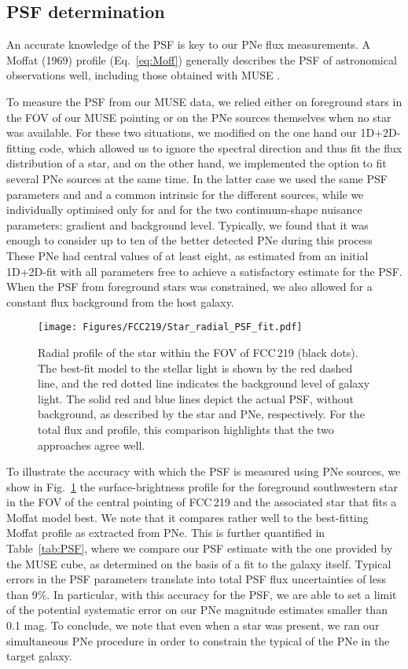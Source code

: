 \documentclass{aa}
\newcommand{\placefigseven}{
\begin{figure}
    \texttt{[image: Figures/FCC219/Star\_radial\_PSF\_fit.pdf]}
    \caption{Radial profile of the star within the FOV of FCC\,219 (black dots). The best-fit model to the stellar light is shown by the red dashed line, and the red dotted line indicates the background level of galaxy light. The solid red and blue lines depict the actual PSF, without background, as described by the star and PNe, respectively. For the total flux and profile, this comparison highlights that the two approaches agree well.}
    \label{fig:PSF_star_vs_PNe}
\end{figure}
}
\begin{document}
\subsection{PSF determination}

An accurate knowledge of the PSF is key to our PNe flux measurements. A Moffat (1969) profile (Eq.~\ref{eq:Moff}) generally describes the PSF of astronomical observations well, including those obtained with MUSE \citep{bacon_muse_2010}.

To measure the PSF from our MUSE data, we relied either on foreground stars in the FOV of our MUSE pointing or on the PNe sources themselves when no star was available. 
For these two situations, we modified on the one hand our 1D+2D-fitting code, which allowed us to ignore the spectral direction and thus fit the flux distribution of a star, and on the other hand, we implemented the option to fit several PNe sources at the same time. 
In the latter case we used the same PSF parameters  and  and a common intrinsic  for the different sources, while we individually optimised only for  and for the two continuum-shape nuisance parameters: gradient and background level. Typically, we found that it was enough to consider up to ten of the better detected PNe during this process These PNe had central  values of at least eight, as estimated from an initial 1D+2D-fit with all parameters free to achieve a satisfactory estimate for the PSF. When the PSF from foreground stars was constrained, we also allowed for a constant flux background from the host galaxy. 

\placefigseven

To illustrate the accuracy with which the PSF is measured using PNe sources, we show in Fig.~\ref{fig:PSF_star_vs_PNe} the surface-brightness profile for the foreground southwestern star in the FOV of the central pointing of FCC\,219 and the associated star that fits a Moffat model best. We note that it compares rather well to the best-fitting Moffat profile as extracted from PNe. This is further quantified in Table~\ref{tab:PSF}, where we compare our PSF estimate with the one provided by the MUSE cube, as determined on the basis of a fit to the galaxy itself. Typical errors in the PSF parameters translate into total PSF flux uncertainties of less than 9\%. In particular, with this accuracy for the PSF, we are able to set a limit of the potential systematic error on our PNe magnitude estimates smaller than 0.1 mag.
To conclude, we note that even when a star was present, we ran our simultaneous PNe procedure in order to constrain the typical  of the PNe in the target galaxy.
\end{document}
